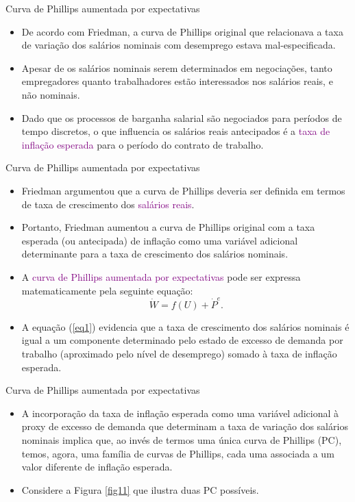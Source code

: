\documentclass[10pt]{beamer}
\begin{document}
\begin{frame}{Curva de Phillips aumentada por expectativas}
    \begin{itemize}
        \item De acordo com Friedman, a curva de Phillips original que relacionava a taxa de variação dos salários nominais com desemprego estava mal-especificada.
        \bigskip
        \item Apesar de os salários nominais serem determinados em negociações, tanto empregadores quanto trabalhadores estão interessados nos salários reais, e não nominais.
        \bigskip
        \item Dado que os processos de barganha salarial são negociados para períodos de tempo discretos, o que influencia os salários reais antecipados é a \textcolor{purple}{taxa de inflação esperada} para o período do contrato de trabalho.
    \end{itemize}    
\end{frame}

\begin{frame}{Curva de Phillips aumentada por expectativas}
    \begin{itemize}
        \item Friedman argumentou que a curva de Phillips deveria ser definida em termos de taxa de crescimento dos \textcolor{purple}{salários reais}.
        \bigskip
        \item Portanto, Friedman aumentou a curva de Phillips original com a taxa esperada (ou antecipada) de inflação como uma variável adicional determinante para a taxa de crescimento dos salários nominais.
        \bigskip
        \item A \textcolor{purple}{curva de Phillips aumentada por expectativas} pode ser expressa matematicamente pela seguinte equação:
        \begin{equation}
            \dot{W} = f(U) + \dot{P}^e.
            \label{eq1}
        \end{equation}
        \bigskip
        \item A equação (\ref{eq1}) evidencia que a taxa de crescimento dos salários nominais é igual a um componente determinado pelo estado de excesso de demanda por trabalho (aproximado pelo nível de desemprego) somado à taxa de inflação esperada.
    \end{itemize}    
\end{frame}

\begin{frame}{Curva de Phillips aumentada por expectativas}
    \begin{itemize}
        \item A incorporação da taxa de inflação esperada como uma variável adicional à proxy de excesso de demanda que determinam a taxa de variação dos salários nominais implica que, ao invés de termos uma única curva de Phillips (PC), temos, agora, uma família de curvas de Phillips, cada uma associada a um valor diferente de inflação esperada.
        \bigskip
        \item Considere a Figura \ref{fig11} que ilustra duas PC possíveis.
    \end{itemize}    
\end{frame}
\end{document}
